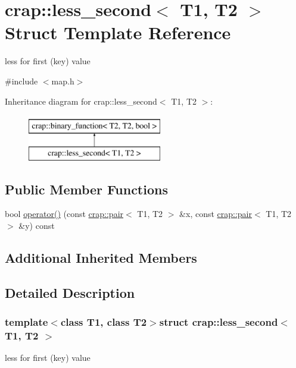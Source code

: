 \hypertarget{structcrap_1_1less__second}{\section{crap\-:\-:less\-\_\-second$<$ T1, T2 $>$ Struct Template Reference}
\label{structcrap_1_1less__second}
}


less for first (key) value  




{\ttfamily \#include $<$map.\-h$>$}

Inheritance diagram for crap\-:\-:less\-\_\-second$<$ T1, T2 $>$\-:\begin{figure}[H]
\begin{center}
\leavevmode
\includegraphics[height=2.000000cm]{structcrap_1_1less__second}
\end{center}
\end{figure}
\subsection*{Public Member Functions}
\begin{DoxyCompactItemize}
\item 
bool \hyperlink{structcrap_1_1less__second_a054ba6edfc2d8c6d2c5b0801700b9380}{operator()} (const \hyperlink{structcrap_1_1pair}{crap\-::pair}$<$ T1, T2 $>$ \&x, const \hyperlink{structcrap_1_1pair}{crap\-::pair}$<$ T1, T2 $>$ \&y) const 
\end{DoxyCompactItemize}
\subsection*{Additional Inherited Members}


\subsection{Detailed Description}
\subsubsection*{template$<$class T1, class T2$>$struct crap\-::less\-\_\-second$<$ T1, T2 $>$}

less for first (key) value 

